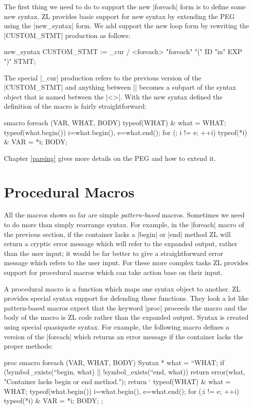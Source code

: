 The first thing we need to do to support the new |foreach| form is to
define some new syntax.  ZL provides basic support for new syntax by
extending the PEG using the |new_syntax| form.  We add support the new
loop form by rewriting the |CUSTOM_STMT| production as follows:
\begin{code}
new_syntax {
  CUSTOM_STMT := _cur / <foreach> "foreach" "(" {ID} "in" {EXP} ")" {STMT};
}
\end{code}
The special |_cur| production refers to the previous version of the
|CUSTOM_STMT| and anything between |{}| becomes a subpart of the
syntax object that is named between the |<>|. 
With the new syntax defined the definition of the macro is fairly
straightforward:

\begin{code}
smacro foreach (VAR, WHAT, BODY) {
  typeof(WHAT) & what = WHAT;
  typeof(what.begin()) i=what.begin(), e=what.end();
  for (; i != e; ++i) {
    typeof(*i) & VAR = *i;
    BODY;
  }
}
\end{code}

Chapter \ref{parsing} gives more details on the PEG and how to
extend it.

\section{Procedural Macros}
\label{foreach-proc}

All the macros shows so far are simple \textit{pattern-based} macros.
Sometimes we need to do more than simply rearrange syntax.  For
example, in the |foreach| macro of the previous section, if the
container lacks a |begin| or |end| method ZL will return a cryptic
error message which will refer to the expanded output, rather than the
user input; it would be far better to give a straightforward error
message which refers to the user input.  For these more complex tasks
ZL provides support for procedural macros which can take action base on
their input.

A procedural macro is a function which maps one syntax object to
another.  ZL provides special syntax support for defending these
functions.  They look a lot like pattern-based macros expect that the
keyword |proc| proceeds the macro and the body of the macro is ZL code
rather than the expanded output.  Syntax is created using special
quasiquote syntax.  For example, the following macro defines a
version of the |foreach| which returns an error message if the
container lacks the proper methods:
\begin{code}
proc smacro foreach (VAR, WHAT, BODY) {
  Syntax * what = ``WHAT;
  if (!symbol_exists(``begin, what) || !symbol_exists(``end, what))
    return error(what, "Container lacks begin or end method.");
  return `{
    typeof(WHAT) & what = WHAT;
    typeof(what.begin()) i=what.begin(), e=what.end();
    for (;i != e; ++i) {typeof(*i) & VAR = *i; BODY;}
  };
}
\end{code}


